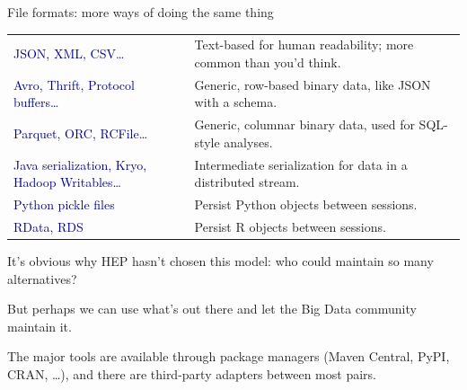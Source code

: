 \documentclass{beamer}
\begin{document}
\begin{frame}{File formats: more ways of doing the same thing}

\vfill
\hspace{-0.4 cm}\begin{minipage}{\linewidth}
\renewcommand{\arraystretch}{1.5}
\begin{tabular}{p{0.4\linewidth} p{0.6\linewidth}}
\textcolor{darkblue}{JSON, XML, CSV\ldots} & Text-based for human readability; more common than you'd think. \\
\raggedright \textcolor{darkblue}{Avro, Thrift, Protocol buffers\ldots} & Generic, row-based binary data, like JSON with a schema. \\
\textcolor{darkblue}{Parquet, ORC, RCFile\ldots} & Generic, columnar binary data, used for SQL-style analyses. \\
\raggedright \textcolor{darkblue}{Java serialization, Kryo, Hadoop Writables\ldots} & Intermediate serialization for data in a distributed stream. \\
\textcolor{darkblue}{Python pickle files} & Persist Python objects between sessions. \\
\textcolor{darkblue}{RData, RDS} & Persist R objects between sessions. \\
\end{tabular}
\end{minipage}
\vfill
\end{frame}

\begin{frame}{}
\begin{center}
\begin{minipage}{0.8\linewidth}
It's obvious why HEP hasn't chosen this model: who could maintain so many alternatives?

\vspace{1.5 cm}
But perhaps we can use what's out there and let the Big Data community maintain it.

\vspace{1.5 cm}
The major tools are available through package managers (Maven Central, PyPI, CRAN, \ldots), and there are third-party adapters between most pairs.
\end{minipage}
\end{center}
\end{frame}
\end{document}
